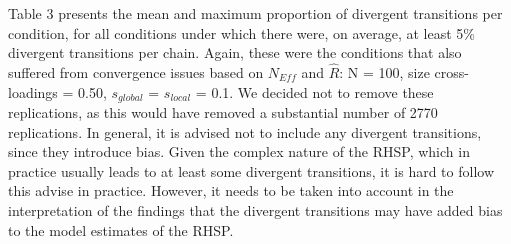 \documentclass[]{interact}
\theoremstyle{plain}%
\theoremstyle{definition}
\theoremstyle{remark}
\begin{document}
Table 3 presents the mean and maximum proportion of divergent
transitions per condition, for all conditions under which there were, on
average, at least 5\% divergent transitions per chain. Again, these were
the conditions that also suffered from convergence issues based on
\(N_{Eff}\) and \(\hat{R}\): N = 100, size cross-loadings = 0.50,
\(s_{global}\) = \(s_{local}\) = 0.1. We decided not to remove these
replications, as this would have removed a substantial number of 2770
replications. In general, it is advised not to include any divergent
transitions, since they introduce bias. Given the complex nature of the
RHSP, which in practice usually leads to at least some divergent
transitions, it is hard to follow this advise in practice. However, it
needs to be taken into account in the interpretation of the findings
that the divergent transitions may have added bias to the model
estimates of the RHSP.
\end{document}
